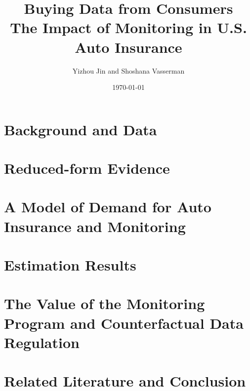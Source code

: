 


\title{Buying Data from Consumers\\
{\large{}The Impact of Monitoring in U.S. Auto Insurance
}
}
\author{Yizhou Jin and Shoshana Vasserman}
\date{
\today
}
\maketitle
{}
\thispagestyle{empty}
\begin{abstract}
\begin{singlespace}

\end{singlespace}
\end{abstract}

\pagebreak{}


\section{Background and Data\label{sec:bg_data}}


\section{Reduced-form Evidence\label{sec:rf}}


\section{A Model of Demand for Auto Insurance and Monitoring\label{sec:demand_model}}


\section{Estimation Results\label{sec:estimation}}


\section{The Value of the Monitoring Program and Counterfactual Data Regulation\label{sec:firm_equi}}


\section{Related Literature and Conclusion}\label{sec:related_lit_and_conclusion}


\printbibliography
\pagebreak{}

\begin{appendices}

\end{appendices}


